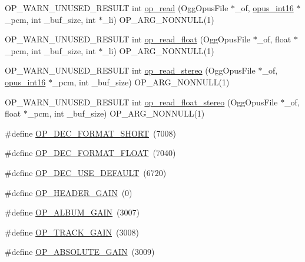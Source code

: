 \begin{DoxyCompactItemize}
\item 
O\+P\+\_\+\+W\+A\+R\+N\+\_\+\+U\+N\+U\+S\+E\+D\+\_\+\+R\+E\+S\+U\+LT int \mbox{\hyperlink{group__stream__decoding_ga963c917749335e29bb2b698c1cb20a10}{op\+\_\+read}} (Ogg\+Opus\+File $\ast$\+\_\+of, \mbox{\hyperlink{opus__types_8h_acc9ed7cf60479eb81f9648c6ec27dc26}{opus\+\_\+int16}} $\ast$\+\_\+pcm, int \+\_\+buf\+\_\+size, int $\ast$\+\_\+li) O\+P\+\_\+\+A\+R\+G\+\_\+\+N\+O\+N\+N\+U\+LL(1)
\item 
O\+P\+\_\+\+W\+A\+R\+N\+\_\+\+U\+N\+U\+S\+E\+D\+\_\+\+R\+E\+S\+U\+LT int \mbox{\hyperlink{group__stream__decoding_ga73493002d84a234f5e19b70f1dddbe2a}{op\+\_\+read\+\_\+float}} (Ogg\+Opus\+File $\ast$\+\_\+of, float $\ast$\+\_\+pcm, int \+\_\+buf\+\_\+size, int $\ast$\+\_\+li) O\+P\+\_\+\+A\+R\+G\+\_\+\+N\+O\+N\+N\+U\+LL(1)
\item 
O\+P\+\_\+\+W\+A\+R\+N\+\_\+\+U\+N\+U\+S\+E\+D\+\_\+\+R\+E\+S\+U\+LT int \mbox{\hyperlink{group__stream__decoding_gaaca17ad3fd6430dc8fd43308149428eb}{op\+\_\+read\+\_\+stereo}} (Ogg\+Opus\+File $\ast$\+\_\+of, \mbox{\hyperlink{opus__types_8h_acc9ed7cf60479eb81f9648c6ec27dc26}{opus\+\_\+int16}} $\ast$\+\_\+pcm, int \+\_\+buf\+\_\+size) O\+P\+\_\+\+A\+R\+G\+\_\+\+N\+O\+N\+N\+U\+LL(1)
\item 
O\+P\+\_\+\+W\+A\+R\+N\+\_\+\+U\+N\+U\+S\+E\+D\+\_\+\+R\+E\+S\+U\+LT int \mbox{\hyperlink{group__stream__decoding_ga9736f96563500c0978f56f0fd6bdad83}{op\+\_\+read\+\_\+float\+\_\+stereo}} (Ogg\+Opus\+File $\ast$\+\_\+of, float $\ast$\+\_\+pcm, int \+\_\+buf\+\_\+size) O\+P\+\_\+\+A\+R\+G\+\_\+\+N\+O\+N\+N\+U\+LL(1)
\item 
\#define \mbox{\hyperlink{group__stream__decoding_ga55ed1cb616d856a47d618fa099c742aa}{O\+P\+\_\+\+D\+E\+C\+\_\+\+F\+O\+R\+M\+A\+T\+\_\+\+S\+H\+O\+RT}}~(7008)
\item 
\#define \mbox{\hyperlink{group__stream__decoding_gac5c6e0837a5d747fd909aff905f5da3f}{O\+P\+\_\+\+D\+E\+C\+\_\+\+F\+O\+R\+M\+A\+T\+\_\+\+F\+L\+O\+AT}}~(7040)
\item 
\#define \mbox{\hyperlink{group__stream__decoding_gaf421eba19d82d5b0c170b548b8ff79f1}{O\+P\+\_\+\+D\+E\+C\+\_\+\+U\+S\+E\+\_\+\+D\+E\+F\+A\+U\+LT}}~(6720)
\item 
\#define \mbox{\hyperlink{group__stream__decoding_ga846edba35e7470251a6a95b1e2364855}{O\+P\+\_\+\+H\+E\+A\+D\+E\+R\+\_\+\+G\+A\+IN}}~(0)
\item 
\#define \mbox{\hyperlink{group__stream__decoding_ga72d2506ae978f7dbd3a6a59c57f21036}{O\+P\+\_\+\+A\+L\+B\+U\+M\+\_\+\+G\+A\+IN}}~(3007)
\item 
\#define \mbox{\hyperlink{group__stream__decoding_ga51082f7c661488bce9bfdf0e5401fabf}{O\+P\+\_\+\+T\+R\+A\+C\+K\+\_\+\+G\+A\+IN}}~(3008)
\item 
\#define \mbox{\hyperlink{group__stream__decoding_ga4215354abbd19df9eab5a5380dd96cb0}{O\+P\+\_\+\+A\+B\+S\+O\+L\+U\+T\+E\+\_\+\+G\+A\+IN}}~(3009)
\end{DoxyCompactItemize}


